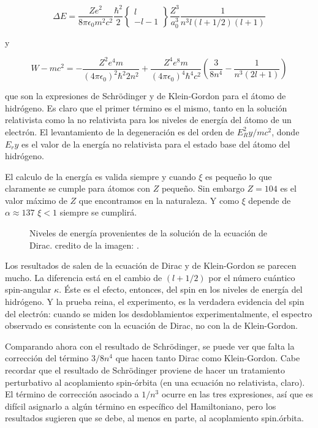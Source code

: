 \documentclass[a4paper, 12pt]{article} %
\begin{document}
\begin{equation}
\Delta E = \frac{Ze^2}{8\pi \epsilon_0 m^2c^2}\frac{\hbar^2}{2} \left\{ \substack{ l \\ -l -1}   \right\}\frac{Z^3}{a^3_0}\frac{1}{n^3 l (l+1/2)(l+1)}
\end{equation}

y 

\begin{equation}
W-mc^2 = -\frac{Z^2e^4m}{(4\pi\epsilon_0)^2\hbar^2 2n^2}+\frac{Z^4e^8m}{(4\pi\epsilon_0)^4\hbar^4 c^2} \left( \frac{ 3}{8n^4}-\frac{1}{n^3(2l+1)} \right)
\end{equation}

que son la expresiones de Schr\"odinger y de Klein-Gordon para el \'atomo de hidr\'ogeno. Es claro que el primer t\'ermino es el mismo, tanto en la soluci\'on relativista como la no relativista para los niveles de energ\'ia del \'atomo de un electr\'on. El levantamiento de la degeneraci\'on es del orden de $E^2_Ry/mc^2$, donde $E_ry$ es el valor de la energ\'ia no relativista para el estado base del \'atomo del hidr\'ogeno.

El calculo de la energ\'ia es valida siempre y cuando $\xi$ es peque\~no lo que claramente
se cumple para \'atomos con $Z$ peque\~no. Sin embargo $Z = 104 $ es el valor m\'aximo 
de $Z$ que encontramos en la naturaleza. Y como $\xi$ depende de $\alpha \approx 137$
$\xi<1$ siempre se cumplir\'a.  

\begin{figure}[H]
\centering
\caption{Niveles de energ\'ia provenientes de la soluci\'on de la ecuaci\'on de Dirac.
credito de la imagen: \cite{strange}.}
\label{fig:relativistic}
\end{figure}

Los resultados de salen de la ecuaci\'on de Dirac y de Klein-Gordon se parecen mucho. La diferencia est\'a en el cambio de $(l+1/2)$ por el n\'umero cu\'antico spin-angular $\kappa$. \'Este es el efecto, entonces, del spin en los niveles de energ\'ia del hidr\'ogeno. Y la prueba reina, el experimento, es la verdadera evidencia del spin del electr\'on: cuando se miden los desdoblamientos experimentalmente, el espectro observado es consistente con la ecuaci\'on de Dirac, no con la de Klein-Gordon.

Comparando ahora con el resultado de Schr\"odinger, se puede ver que falta la correcci\'on del t\'ermino $3/8n^4$ que hacen tanto Dirac como Klein-Gordon. Cabe recordar que el resultado de Schr\"odinger proviene de hacer un tratamiento perturbativo al acoplamiento spin-\'orbita (en una ecuaci\'on no relativista, claro). El t\'ermino de correcci\'on asociado a $1/n^3$ ocurre en las tres expresiones, as\'i que es dif\'icil asignarlo a alg\'un t\'ermino en espec\'ifico del Hamiltoniano, pero los resultados sugieren que se debe, al menos en parte, al acoplamiento spin.\'orbita.
\end{document}
